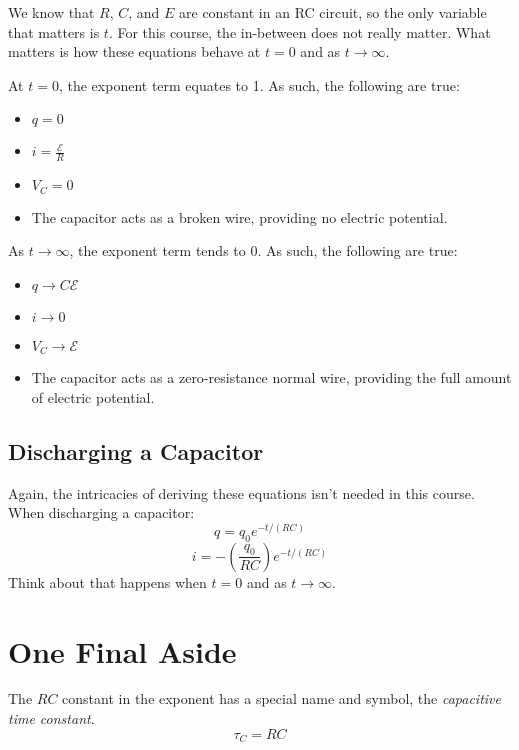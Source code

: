 \documentclass[]{article}
\begin{document}
We know that $ R $, $ C $, and $ E $ are constant in an RC circuit, so the only variable that matters is $ t $. For this course, the in-between does not really matter. What matters is how these equations behave at $ t = 0 $ and as $ t \to \infty $.

At $ t = 0 $, the exponent term equates to 1. As such, the following are true:
\begin{itemize}
  \item $ q = 0 $
  \item $ i = \frac{\mathcal{E}}{R} $
  \item $ V_C = 0 $
  \item The capacitor acts as a broken wire, providing no electric potential.
\end{itemize}
As $ t \to \infty $, the exponent term tends to 0. As such, the following are true:
\begin{itemize}
  \item $ q \to C \mathcal{E} $
  \item $ i \to 0 $
  \item $ V_C \to \mathcal{E} $
  \item The capacitor acts as a zero-resistance normal wire, providing the full amount of electric potential.
\end{itemize}

\subsection{Discharging a Capacitor}
Again, the intricacies of deriving these equations isn't needed in this course. When discharging a capacitor:
\[ q = q_0 e^{-t/(RC)} \]
\[ i = -\left(\frac{q_0}{RC}\right) e^{-t/(RC)} \]
Think about that happens when $ t = 0 $ and as $ t \to \infty $.

\section{One Final Aside}
The $ RC $ constant in the exponent has a special name and symbol, the \emph{capacitive time constant}.
\[ \tau_C = RC \]
\end{document}
